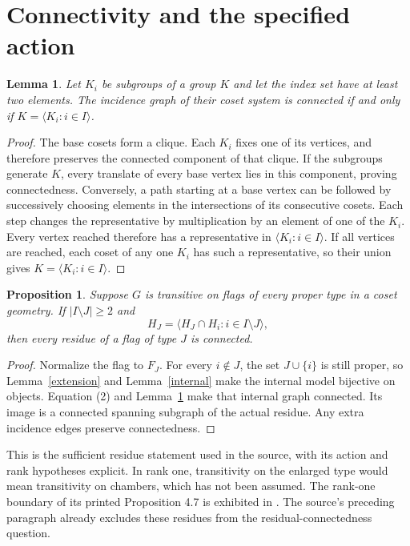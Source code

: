 \documentclass[11pt]{article}
\newtheorem{lemma}[theorem]{Lemma}
\newtheorem{proposition}[theorem]{Proposition}
\newcommand{\gen}[1]{\langle #1\rangle}
\begin{document}
\section{Connectivity and the specified action}
\begin{lemma}\label{connected}
Let $K_i$ be subgroups of a group $K$ and let the index set have at
least two elements. The incidence graph of their coset system is
connected if and only if $K=\gen{K_i:i\in I}$.
\end{lemma}
\begin{proof}
The base cosets form a clique. Each $K_i$ fixes one of its vertices,
and therefore preserves the connected component of that clique.
If the subgroups generate $K$, every translate of every base vertex
lies in this component, proving connectedness. Conversely, a path
starting at a base vertex can be followed by successively choosing
elements in the intersections of its consecutive cosets. Each step
changes the representative by multiplication by an element of one
of the $K_i$. Every vertex reached therefore has a representative in
$\gen{K_i:i\in I}$. If all vertices are reached, each coset of any
one $K_i$ has such a representative, so their union gives
$K=\gen{K_i:i\in I}$.
\end{proof}

\begin{proposition}\label{properconnected}
Suppose $G$ is transitive on flags of every proper type in a coset
geometry. If $|I\setminus J|\geq2$ and
\[
 H_J=\gen{H_J\cap H_i:i\in I\setminus J},                 \tag{2}
\]
then every residue of a flag of type $J$ is connected.
\end{proposition}
\begin{proof}
Normalize the flag to $F_J$. For every $i\notin J$, the set
$J\cup\{i\}$ is still proper, so Lemma~\ref{extension} and
Lemma~\ref{internal} make the internal model bijective on objects.
Equation (2) and Lemma~\ref{connected} make that internal graph
connected. Its image is a connected spanning subgraph of the actual
residue. Any extra incidence edges preserve connectedness.
\end{proof}

This is the sufficient residue statement used in the source, with
its action and rank hypotheses explicit. In rank one, transitivity
on the enlarged type would mean transitivity on chambers, which
has not been assumed. The rank-one boundary of its printed
Proposition 4.7 is exhibited in \cite{CF}. The source's preceding
paragraph already excludes these residues from the residual-connectedness
question.
\end{document}

